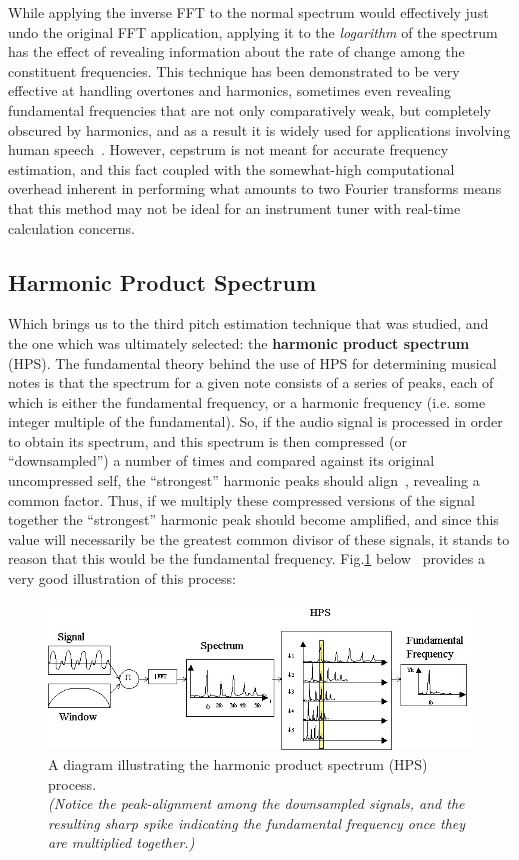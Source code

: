 \documentclass[12pt]{report}
\begin{document}
\indent While applying the inverse FFT to the normal spectrum would effectively just undo the original FFT application, applying it to the \emph{logarithm} of the spectrum has the effect of revealing information about the rate of change among the constituent frequencies. This technique has been demonstrated to be very effective at handling overtones and harmonics, sometimes even revealing fundamental frequencies that are not only comparatively weak, but completely obscured by harmonics, and as a result it is widely used for applications involving human speech~\cite{delaCuadra-nd}. However, cepstrum is not meant for accurate frequency estimation, and this fact coupled with the somewhat-high computational overhead inherent in performing what amounts to two Fourier transforms means that this method may not be ideal for an instrument tuner with real-time calculation concerns.

\subsection*{Harmonic Product Spectrum}
\indent Which brings us to the third pitch estimation technique that was studied, and the one which was ultimately selected: the {\bf harmonic product spectrum} (HPS). The fundamental theory behind the use of HPS for determining musical notes is that the spectrum for a given note consists of a series of peaks, each of which is either the fundamental frequency, or a harmonic frequency (i.e. some integer multiple of the fundamental). So, if the audio signal is processed in order to obtain its spectrum, and this spectrum is then compressed (or ``downsampled'') a number of times and compared against its original uncompressed self, the ``strongest'' harmonic peaks should align~\cite{Middleton2003}, revealing a common factor. Thus, if we multiply these compressed versions of the signal together the ``strongest'' harmonic peak should become amplified, and since this value will necessarily be the greatest common divisor of these signals, it stands to reason that this would be the fundamental frequency. Fig.\ref{fig:hps} below~\cite{delaCuadra-nd} provides a very good illustration of this process:
\clearpage
\begin{figure}[h]
	\centering
	\includegraphics[width=150mm]{hps.jpg}
	\caption[HPS Diagram]{A diagram illustrating the harmonic product spectrum (HPS) process. \\\emph{(Notice the peak-alignment among the downsampled signals, and the resulting sharp spike indicating the fundamental frequency once they are multiplied together.)}} 
	\label{fig:hps} 
\end{figure}
\end{document}

